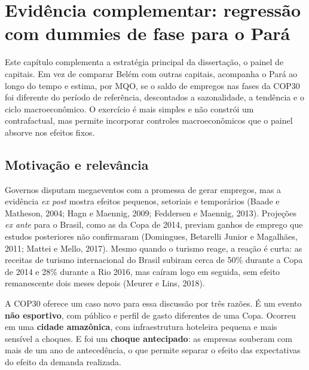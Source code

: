 \chapter{Evidência complementar: regressão com dummies de fase para o Pará}\label{cap:macro}

Este capítulo complementa a estratégia principal da dissertação, o painel de capitais. Em vez de comparar Belém com outras capitais, acompanha o Pará ao longo do tempo e estima, por MQO, se o saldo de empregos nas fases da COP30 foi diferente do período de referência, descontados a sazonalidade, a tendência e o ciclo macroeconômico. O exercício é mais simples e não constrói um contrafactual, mas permite incorporar controles macroeconômicos que o painel absorve nos efeitos fixos.


\noindent{}

\section{Motivação e relevância}

Governos disputam megaeventos com a promessa de gerar empregos, mas a evidência \textit{ex post}
mostra efeitos pequenos, setoriais e temporários (Baade e Matheson, 2004; Hagn e Maennig, 2009;
Feddersen e Maennig, 2013). Projeções \textit{ex ante} para o Brasil, como as da Copa de 2014,
previam ganhos de emprego que estudos posteriores não confirmaram (Domingues, Betarelli Junior e
Magalhães, 2011; Mattei e Mello, 2017). Mesmo quando o turismo reage, a reação é curta: as receitas de
turismo internacional do Brasil subiram cerca de 50\% durante a Copa de 2014 e 28\% durante a Rio 2016,
mas caíram logo em seguida, sem efeito remanescente dois meses depois (Meurer e Lins, 2018).

A COP30 oferece um caso novo para essa discussão por três razões. É um evento \textbf{não esportivo},
com público e perfil de gasto diferentes de uma Copa. Ocorreu em uma \textbf{cidade amazônica}, com
infraestrutura hoteleira pequena e mais sensível a choques. E foi um \textbf{choque antecipado}: as
empresas souberam com mais de um ano de antecedência, o que permite separar o efeito das
expectativas do efeito da demanda realizada.

